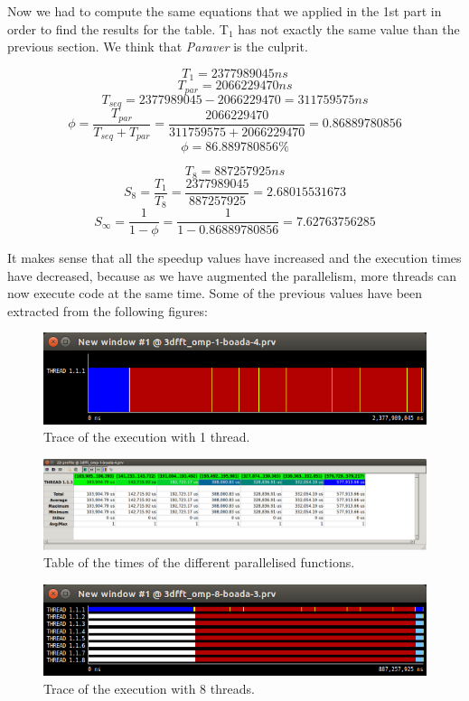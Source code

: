 \documentclass[12pt, a4paper]{article}
\begin{document}
Now we had to compute the same equations that we applied in the 1st part in order to find the results for the table. T$_1$ has not exactly the same value than the previous section. We think that \textit{Paraver} is the culprit.

\[T_1 = 2377989045 ns \] 
\[T_{par} = 2066229470 ns \]
\[T_{seq} = 2377989045 - 2066229470 = 311759575 ns \]
\[\phi = \dfrac{T_{par}} {T_{seq} + T_{par}} = \dfrac{2066229470} {311759575 + 2066229470} = 0.86889780856 \]
\[\phi = 86.889780856\% \]

\[T_8 = 887257925 ns \]
\[S_8 = \dfrac{T_1}{T_8} = \dfrac{2377989045}{887257925} = 2.68015531673 \]
\[S_\infty = \dfrac{1}{1 - \phi} = \dfrac{1} {1 - 0.86889780856} = 7.62763756285 \]

It makes sense that all the speedup values have increased and the execution times have decreased, because as we have augmented the parallelism, more threads can now execute code at the same time. Some of the previous values have been extracted from the following figures:

\begin{figure}[H]
  \centering
  \includegraphics[scale=0.5]{./images/v1_t1}
  \caption{Trace of the execution with 1 thread.}
  \label{v1_t1}
\end{figure}

\begin{figure}[H]
  \centering
  \includegraphics[scale=0.25]{./images/v1_excel_tpar}
  \caption{Table of the times of the different parallelised functions.}
  \label{v1_excel_tpar}
\end{figure}

\begin{figure}[H]
  \centering
  \includegraphics[scale=0.5]{./images/v1_t8}
  \caption{Trace of the execution with 8 threads.}
  \label{v1_t8}
\end{figure}
\end{document}
